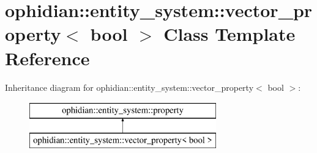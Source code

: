 \hypertarget{classophidian_1_1entity__system_1_1vector__property_3_01bool_01_4}{\section{ophidian\-:\-:entity\-\_\-system\-:\-:vector\-\_\-property$<$ bool $>$ Class Template Reference}
\label{classophidian_1_1entity__system_1_1vector__property_3_01bool_01_4}
}
Inheritance diagram for ophidian\-:\-:entity\-\_\-system\-:\-:vector\-\_\-property$<$ bool $>$\-:\begin{figure}[H]
\begin{center}
\leavevmode
\includegraphics[height=2.000000cm]{classophidian_1_1entity__system_1_1vector__property_3_01bool_01_4}
\end{center}
\end{figure}
